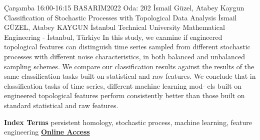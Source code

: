 
    \begin{abstract_basarim}
    {Çarşamba 16:00-16:15}
    {BASARIM2022}
    {Oda: 202}
    {İsmail Güzel, Atabey Kaygun}
    {Classification of Stochastic Processes with Topological Data Analysis}
    {%
    İsmail GÜZEL, Atabey KAYGUN}
    {%
    }
    {%
    İstanbul Technical University Mathematical Engineering - İstanbul, Türkiye}
    In this study, we examine if engineered topological features can distinguish time series sampled from different stochastic processes with different noise characteristics, in both balanced and unbalanced sampling schemes. We compare our classification results against the results of the same classification tasks built on statistical and raw features. We conclude that in classification tasks of time series, different machine learning mod- els built on engineered topological features perform consistently better than those built on standard statistical and raw features. 
    
            \textbf{Index Terms} \newline{}persistent homology, stochastic process, machine learning, feature engineering
     \newline\newline\noindent \href{https://drive.google.com/file/d/1SSqRZa7J0AUgMIr_J-DhLta3yRiMYeZG/view?usp=drivesdk}{\bfseries Online Access}
    \end{abstract_basarim}
    